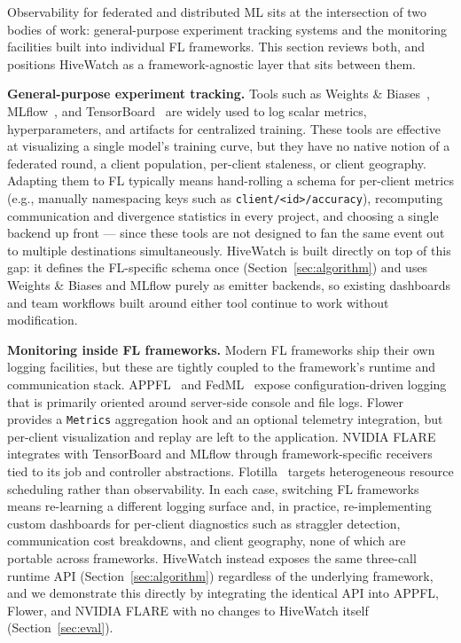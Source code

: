 Observability for federated and distributed ML sits at the intersection of two bodies of work: general-purpose experiment tracking systems and the monitoring facilities built into individual FL frameworks. This section reviews both, and positions HiveWatch as a framework-agnostic layer that sits between them.

\textbf{General-purpose experiment tracking.} Tools such as Weights \& Biases~\cite{wandb}, MLflow~\cite{mlflow}, and TensorBoard~\cite{tensorboard} are widely used to log scalar metrics, hyperparameters, and artifacts for centralized training. These tools are effective at visualizing a single model's training curve, but they have no native notion of a federated round, a client population, per-client staleness, or client geography. Adapting them to FL typically means hand-rolling a schema for per-client metrics (e.g., manually namespacing keys such as \texttt{client/\textless id\textgreater/accuracy}), recomputing communication and divergence statistics in every project, and choosing a single backend up front — since these tools are not designed to fan the same event out to multiple destinations simultaneously. HiveWatch is built directly on top of this gap: it defines the FL-specific schema once (Section~\ref{sec:algorithm}) and uses Weights \& Biases and MLflow purely as emitter backends, so existing dashboards and team workflows built around either tool continue to work without modification.

\textbf{Monitoring inside FL frameworks.} Modern FL frameworks ship their own logging facilities, but these are tightly coupled to the framework's runtime and communication stack. APPFL~\cite{ryu2022appfl, li2025advances} and FedML~\cite{he2020fedml} expose configuration-driven logging that is primarily oriented around server-side console and file logs. Flower~\cite{beutel2020flower} provides a \texttt{Metrics} aggregation hook and an optional telemetry integration, but per-client visualization and replay are left to the application. NVIDIA FLARE~\cite{roth2022nvidia} integrates with TensorBoard and MLflow through framework-specific receivers tied to its job and controller abstractions. Flotilla~\cite{banerjee2025flotilla} targets heterogeneous resource scheduling rather than observability. In each case, switching FL frameworks means re-learning a different logging surface and, in practice, re-implementing custom dashboards for per-client diagnostics such as straggler detection, communication cost breakdowns, and client geography, none of which are portable across frameworks. HiveWatch instead exposes the same three-call runtime API (Section~\ref{sec:algorithm}) regardless of the underlying framework, and we demonstrate this directly by integrating the identical API into APPFL, Flower, and NVIDIA FLARE with no changes to HiveWatch itself (Section~\ref{sec:eval}).

